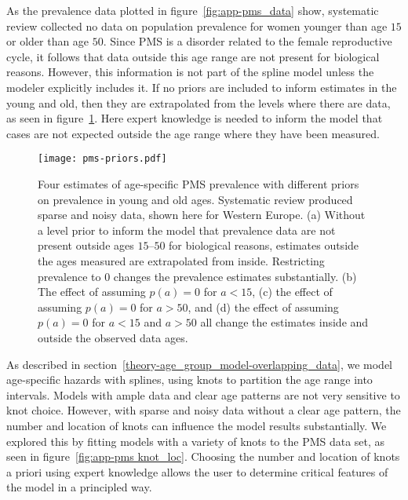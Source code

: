 As the prevalence data plotted in figure~\ref{fig:app-pms_data} show,
systematic review collected no data on population prevalence for women
younger than age $15$ or older than age $50$.  Since PMS is a disorder
related to the female reproductive cycle, it follows that data outside
this age range are not present for biological reasons.  However, this
information is not part of the spline model unless the modeler
explicitly includes it.  If no priors are included to inform estimates
in the young and old, then they are extrapolated from the levels where
there are data, as seen in figure~\ref{fig:app-pms prios_on_level}.
Here expert knowledge is needed to inform the model that cases are not
expected outside the age range where they have been measured.

    \begin{figure}
        \begin{center}
            \texttt{[image: pms-priors.pdf]}
        \end{center}
        \caption[Four estimates of age-specific PMS prevalence with
          different priors on prevalence in young and old ages]{Four
          estimates of age-specific PMS prevalence with different
          priors on prevalence in young and old ages.  Systematic
          review produced sparse and noisy data, shown here for
          Western Europe.  (a) Without a level prior to inform the
          model that prevalence data are not present outside 
          ages $15$--$50$ for biological reasons, estimates outside the
          ages measured are extrapolated from inside.  Restricting
          prevalence to $0$ changes the prevalence estimates
          substantially. (b) The effect of assuming $p(a) = 0$ for
          $a<15$, (c) the effect of assuming $p(a) = 0$ for $a>50$,
          and (d) the effect of assuming $p(a) = 0$ for $a<15$ and
          $a>50$ all change the estimates inside and outside the
          observed data ages.}
        \label{fig:app-pms prios_on_level}
    \end{figure}


As described in
section~\ref{theory-age_group_model-overlapping_data}, we model
age-specific hazards with splines, using knots to partition the age
range into intervals.  Models with ample data and clear age patterns
are not very sensitive to knot choice.  However, with sparse and
noisy data without a clear age pattern, the number and location of
knots can influence the model results substantially.  We explored this
by fitting models with a variety of knots to the PMS data set, as seen
in figure~\ref{fig:app-pms knot_loc}.  Choosing the number and
location of knots a priori using expert knowledge allows the user to
determine critical features of the model in a principled way.

